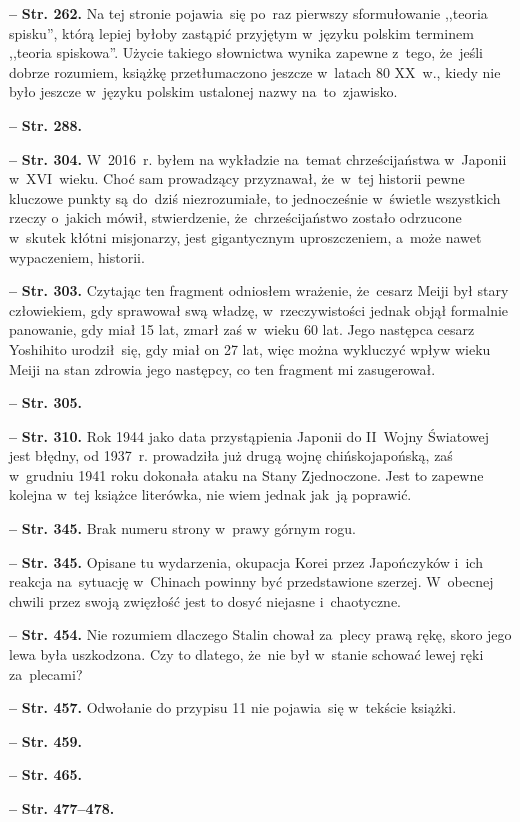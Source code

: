 \documentclass[a4paper,11pt]{article}
\newcommand{\tb}{\textbf}
\newcommand{\noi}{\noindent}
\newcommand{\start}{\noi \tb{--} {}}
\newcommand{\Str}[1]{\tb{Str. #1.}}
\begin{document}
\start \Str{262} Na tej stronie pojawia~się po~raz pierwszy
sformułowanie ,,teoria spisku'', którą lepiej byłoby zastąpić
przyjętym w~języku polskim terminem ,,teoria spiskowa''. Użycie
takiego słownictwa wynika zapewne z~tego, że~jeśli dobrze rozumiem,
książkę przetłumaczono jeszcze w~latach 80 XX~w., kiedy nie było
jeszcze w~języku polskim ustalonej nazwy na~to~zjawisko.

\start \Str{288}

\start \Str{304} W~2016~r. byłem na wykładzie na~temat chrześcijaństwa
w~Japonii w~XVI~wieku. Choć sam prowadzący przyznawał, że~w~tej
historii pewne kluczowe punkty są do~dziś niezrozumiałe, to
jednocześnie w~świetle wszystkich rzeczy o~jakich mówił, stwierdzenie,
że~chrześcijaństwo zostało odrzucone w~skutek kłótni misjonarzy, jest
gigantycznym uproszczeniem, a~może nawet wypaczeniem, historii.

\start \Str{303} Czytając ten fragment odniosłem wrażenie, że~cesarz
Meiji był stary człowiekiem, gdy sprawował swą władzę,
w~rzeczywistości jednak objął formalnie panowanie, gdy miał 15 lat,
zmarł zaś w~wieku 60 lat. Jego następca cesarz Yoshihito urodził~się,
gdy miał on 27 lat, więc można wykluczyć wpływ wieku Meiji na stan
zdrowia jego następcy, co ten fragment mi zasugerował.

\start \Str{305}

\start \Str{310} Rok 1944 jako data przystąpienia Japonii do II~Wojny
Światowej jest błędny, od 1937~r. prowadziła już drugą wojnę
chińsko\dywiz japońską, zaś w~grudniu 1941 roku dokonała ataku na
Stany Zjednoczone. Jest to zapewne kolejna w~tej książce literówka,
nie wiem jednak jak~ją poprawić.

\start \Str{345} Brak numeru strony w~prawy górnym rogu.

\start \Str{345} Opisane tu wydarzenia, okupacja Korei przez
Japończyków i~ich reakcja na~sytuację w~Chinach powinny być
przedstawione szerzej. W~obecnej chwili przez swoją zwięzłość jest to
dosyć niejasne i~chaotyczne.

\start \Str{454} Nie rozumiem dlaczego Stalin chował za~plecy prawą
rękę, skoro jego lewa była uszkodzona. Czy to dlatego, że~nie był
w~stanie schować lewej ręki za~plecami?

\start \Str{457} Odwołanie do przypisu 11 nie pojawia~się w~tekście
książki.

\start \Str{459}

\start \Str{465}

\start \Str{477--478}
\end{document}
